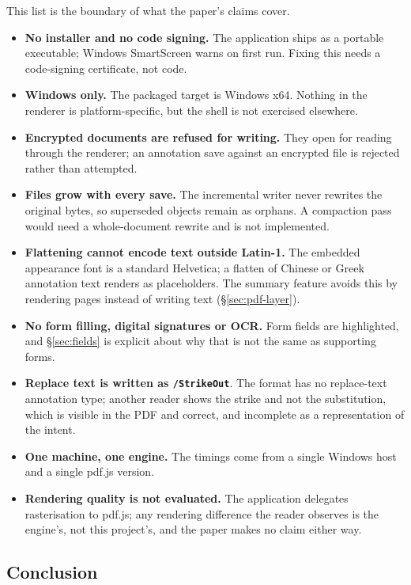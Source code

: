 This list is the boundary of what the paper's claims cover.

\begin{itemize}
  \item \textbf{No installer and no code signing.} The application ships as a portable
        executable; Windows SmartScreen warns on first run. Fixing this needs a code-signing
        certificate, not code.
  \item \textbf{Windows only.} The packaged target is Windows x64. Nothing in the renderer is
        platform-specific, but the shell is not exercised elsewhere.
  \item \textbf{Encrypted documents are refused for writing.} They open for reading through the
        renderer; an annotation save against an encrypted file is rejected rather than
        attempted.
  \item \textbf{Files grow with every save.} The incremental writer never rewrites the original
        bytes, so superseded objects remain as orphans. A compaction pass would need a
        whole-document rewrite and is not implemented.
  \item \textbf{Flattening cannot encode text outside Latin-1.} The embedded appearance font is
        a standard Helvetica; a flatten of Chinese or Greek annotation text renders as
        placeholders. The summary feature avoids this by rendering pages instead of writing
        text (\S\ref{sec:pdf-layer}).
  \item \textbf{No form filling, digital signatures or OCR.} Form fields are highlighted, and
        \S\ref{sec:fields} is explicit about why that is not the same as supporting forms.
  \item \textbf{Replace text is written as \texttt{/StrikeOut}}. The format has no replace-text
        annotation type; another reader shows the strike and not the substitution, which is
        visible in the PDF and correct, and incomplete as a representation of the intent.
  \item \textbf{One machine, one engine.} The timings come from a single Windows host and a
        single pdf.js version.
  \item \textbf{Rendering quality is not evaluated.} The application delegates rasterisation to
        pdf.js; any rendering difference the reader observes is the engine's, not this
        project's, and the paper makes no claim either way.
\end{itemize}

\subsection{Conclusion}

